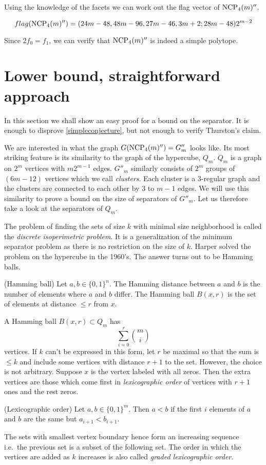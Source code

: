 Using the knowledge of the facets we can work out the flag vector of 
$\textrm{NCP}_4(m)''$.

\begin{equation}
 flag(\textrm{NCP}_4(m)'') = (24m-48, 48m-96, 27m - 46, 3m+2; 28m -48)2^{m-2}
\end{equation}

Since $2f_0 = f_1$, we can verify that $\textrm{NCP}_4(m)''$ is indeed a simple 
polytope.

\section{Lower bound, straightforward approach}

In this section we shall show an easy proof for a bound on the separator. It
is enough to disprove \ref{simpleconjecture}, but not enough to verify Thurston's
claim.

We are interested in what the graph $G(\textrm{NCP}_4(m)'') = G''_m$ looks like. Its 
most striking feature is its similarity to the graph of the hypercube, $Q_m$. 
$Q_m$ is a graph on $2^m$ vertices with $m2^{m-1}$ edges. $G''_m$ 
similarly consists of $2^m$ groups of $(6m-12)$ vertices which we call 
\textit{clusters}. Each cluster is a 3-regular graph and the clusters are 
connected to each other by 3 to $m-1$ edges. We will use this similarity to 
prove a bound on the size of separators of $G''_m$. Let us therefore take a 
look at the separators of $Q_m$.

The problem of finding the sets of size $k$ with minimal size neighborhood is 
called the \textit{discrete isoperimetric problem}. It is a generalization of 
the minimum separator problem as there is no restriction on the size of $k$. 
Harper \cite{Harp} solved the problem on the hypercube in the 1960's. The 
answer turns out to be Hamming balls.

\begin{definition}
 (Hamming ball) Let $a,b \in \{0,1\}^n$. The Hamming distance between $a$ and 
$b$ is the number of elements where $a$ and $b$ differ. The Hamming ball 
$B(x,r)$ is the set of elements at distance $\leq r$ from $x$.
\end{definition}

A Hamming ball $B(x,r) \subset Q_m$ has 
\begin{equation}
 \sum_{i=0}^r {m \choose i}
\end{equation}
vertices. If $k$ can't be expressed in this form, let $r$ be maximal so that 
the sum is $\leq k$ and include some vertices with distance $r+1$ to the set. 
However, the choice is not arbitrary. Suppose $x$ is the vertex labeled with 
all zeros. Then the extra vertices are those which come first in 
\textit{lexicographic order} of vertices with $r+1$ ones and the rest zeros.
\begin{definition}
 (Lexicographic order) Let $a,b \in \{0,1\}^m$. Then $a<b$ if the first $i$ 
elements of $a$ and $b$ are the same but $a_{i+1} < b_{i+1}$.
\end{definition}
The sets with smallest vertex boundary hence form an increasing sequence i.e.\ 
the previous set is a subset of the following set. The order in which the 
vertices are added as $k$ increases is also called \textit{graded lexicographic 
order}.

